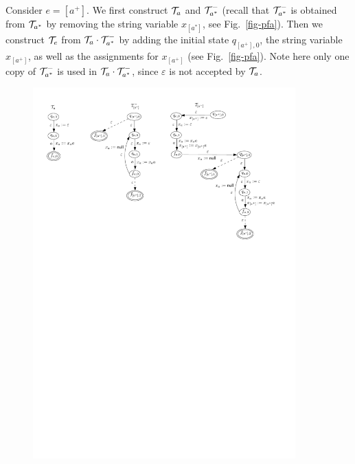 \begin{example}\label{exmp-pfa}
Consider {\pcre} $e = [a^+]$. 
We first construct $\mathcal{T}_{a}$ and $\mathcal{T}^-_{a^*}$ (recall that $\mathcal{T}^-_{a^*}$ is obtained from $\mathcal{T}_{a^*}$ by removing the string variable $x_{[a^*]}$, see Fig.~\ref{fig-pfa}).  Then we construct $\mathcal{T}_{e}$ from $\mathcal{T}_{a} \cdot \mathcal{T}^-_{a^*}$ by adding the initial state $q_{[a^+],0}$, the string variable $x_{[a^+]}$, as well as the assignments for $x_{[a^+]}$ (see Fig.~\ref{fig-pfa}). Note here only one copy of $\mathcal{T}^-_{a^*}$ is used in $\mathcal{T}_{a} \cdot \mathcal{T}^-_{a^*}$, since $\varepsilon$ is not accepted by $\mathcal{T}_{a}$.
	\begin{figure}[tb]
		\centering
		\includegraphics[width=0.9\textwidth]{pfa-new.pdf}

\end{figure}
\end{example}
